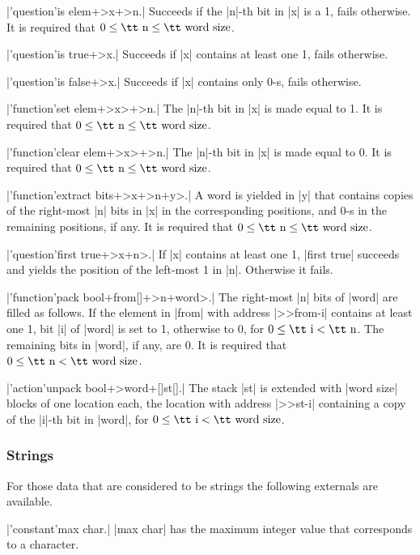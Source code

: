 \documentclass{article}
\begin{document}
\X\pp|'question'is elem+>x+>n.|\Y
Succeeds if the \pp|n|-th bit in \pp|x| is a 1, fails otherwise. It is
required that $0\le\mbox{\tt n}\le\mbox{\tt word size}$.

\X\pp|'question'is true+>x.|\Y
Succeeds if \pp|x| contains at least one 1, fails otherwise.

\X\pp|'question'is false+>x.|\Y
Succeeds if \pp|x| contains only 0-s, fails otherwise.

\X\pp|'function'set elem+>x>+>n.|\Y
The \pp|n|-th bit in \pp|x| is made equal to 1. It is required that
$0\le\mbox{\tt n}\le\mbox{\tt word size}$.

\X\pp|'function'clear elem+>x>+>n.|\Y
The \pp|n|-th bit in \pp|x| is made equal to 0. It is required that
$0\le\mbox{\tt n}\le\mbox{\tt word size}$.

\X\pp|'function'extract bits+>x+>n+y>.|\Y
A word is yielded in \pp|y| that contains copies of the right-most \pp|n|
bits in \pp|x| in the corresponding positions, and 0-s in the remaining
positions, if any. It is required that $0\le\mbox{\tt n}\le\mbox{\tt word
size}$.

\X\pp|'question'first true+>x+n>.|\Y
If \pp|x| contains at least one 1, \pp|first true| succeeds and yields the
position of the left-most 1 in \pp|n|. Otherwise it fails.

\smallskip
\X\pp|'function'pack bool+from[]+>n+word>.|\Y
The right-most \pp|n| bits of \pp|word| are filled as follows. If the
element in \pp|from| with address \pp|>>from-i| contains at least one 1, bit
\pp|i| of \pp|word| is set to 1, otherwise to 0, for $0\le\mbox{\tt
i}<\mbox{\tt n}$. The remaining bits in \pp|word|, if any, are 0. It is
required that $0\le\mbox{\tt n}<\mbox{\tt word size}$.

\X\pp|'action'unpack bool+>word+[]st[].|\Y
The stack \pp|st| is extended with \pp|word size| blocks of one location
each, the location with address \pp|>>st-i| containing a copy of the
\pp|i|-th bit in \pp|word|, for $0\le\mbox{\tt i}<\mbox{\tt word size}$.

\subsubsection{Strings}\label{5.2.3}

For those data that are considered to be strings the
following externals are available.

\X\pp|'constant'max char.|\Y
\pp|max char| has the maximum integer value that corresponds to a character.
\end{document}
